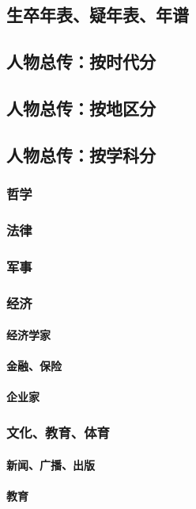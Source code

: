 \documentclass[UTF8]{../RepresentationUniverse}
\begin{document}
    \subsection{生卒年表、疑年表、年谱}
    \subsection{人物总传：按时代分}
    \subsection{人物总传：按地区分}
    \subsection{人物总传：按学科分}
        \subsubsection{哲学}
        \subsubsection{法律}
        \subsubsection{军事}
        \subsubsection{经济}
            \paragraph{经济学家}
            \paragraph{金融、保险}
            \paragraph{企业家}
        \subsubsection{文化、教育、体育}
            \paragraph{新闻、广播、出版}
            \paragraph{教育}
\end{document}
